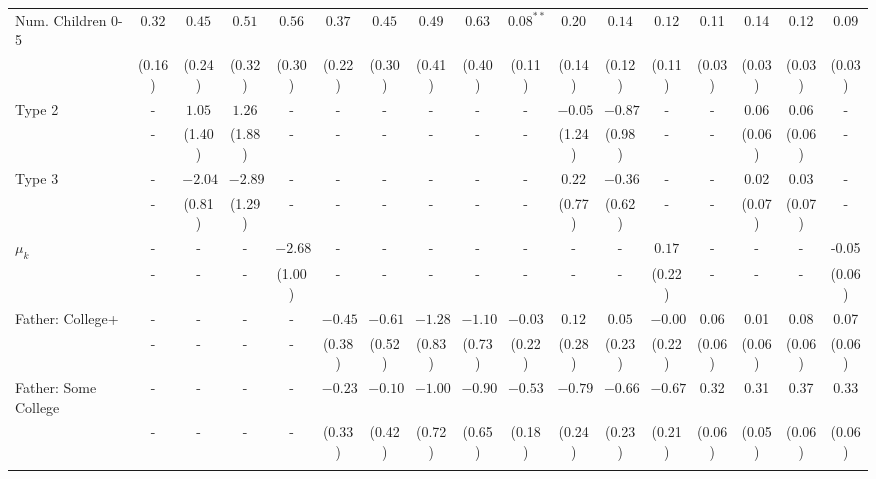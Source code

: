 \begin{tabular}{lcccccccccccccccc}
Num. Children 0-5&$0.32$&$0.45$&$0.51$&$0.56$&$0.37$&$0.45$&$0.49$&$0.63$&$0.08^{**}$&$0.20$&$0.14$&$0.12$&0.11&0.14&0.12&0.09\\
&(0.16)&(0.24)&(0.32)&(0.30)&(0.22)&(0.30)&(0.41)&(0.40)&(0.11)&(0.14)&(0.12)&(0.11)&(0.03)&(0.03)&(0.03)&(0.03)\\
Type 2&-&$1.05$&$1.26$&-&-&-&-&-&-&$-0.05$&$-0.87$&-&-&0.06&0.06&-\\
&-&(1.40)&(1.88)&-&-&-&-&-&-&(1.24)&(0.98)&-&-&(0.06)&(0.06)&-\\
Type 3&-&$-2.04$&$-2.89$&-&-&-&-&-&-&$0.22$&$-0.36$&-&-&0.02&0.03&-\\
&-&(0.81)&(1.29)&-&-&-&-&-&-&(0.77)&(0.62)&-&-&(0.07)&(0.07)&-\\
$\mu_{k}$&-&-&-&$-2.68$&-&-&-&-&-&-&-&$0.17$&-&-&-&-0.05\\
&-&-&-&(1.00)&-&-&-&-&-&-&-&(0.22)&-&-&-&(0.06)\\
Father: College+&-&-&-&-&$-0.45$&$-0.61$&$-1.28$&$-1.10$&$-0.03$&$0.12$&$0.05$&$-0.00$&0.06&0.01&0.08&0.07\\
&-&-&-&-&(0.38)&(0.52)&(0.83)&(0.73)&(0.22)&(0.28)&(0.23)&(0.22)&(0.06)&(0.06)&(0.06)&(0.06)\\
Father: Some College&-&-&-&-&$-0.23$&$-0.10$&$-1.00$&$-0.90$&$-0.53$&$-0.79$&$-0.66$&$-0.67$&0.32&0.31&0.37&0.33\\
&-&-&-&-&(0.33)&(0.42)&(0.72)&(0.65)&(0.18)&(0.24)&(0.23)&(0.21)&(0.06)&(0.05)&(0.06)&(0.06)\\
\\
\bottomrule\end{tabular}